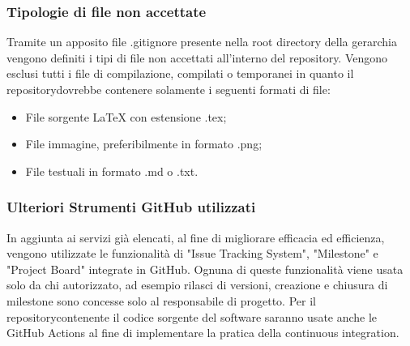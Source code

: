 	\subsubsection{Tipologie di file non accettate}
		Tramite un apposito file .gitignore presente nella root directory della gerarchia vengono definiti i tipi di file non accettati all'interno del repository\glo. Vengono esclusi tutti i file di compilazione, compilati o temporanei in quanto il repository\glosp dovrebbe contenere solamente i seguenti formati di file:
		\begin{itemize}
			\item File sorgente \LaTeX \xspace con estensione .tex;
			\item File immagine, preferibilmente in formato .png;
			\item File testuali in formato .md o .txt.			
		\end{itemize}
	
	\subsubsection{Ulteriori Strumenti GitHub utilizzati}
		In aggiunta ai servizi già elencati, al fine di migliorare efficacia ed efficienza, vengono utilizzate le funzionalità di "Issue Tracking System",
		"Milestone" e "Project Board" integrate in GitHub. Ognuna di queste funzionalità viene usata solo da chi autorizzato, ad esempio rilasci di versioni, creazione e chiusura di milestone sono concesse solo al responsabile di progetto.
		\newline
		Per il repository\glosp contenente il codice sorgente del software saranno usate anche le GitHub Actions al fine di implementare la pratica della continuous integration.
		